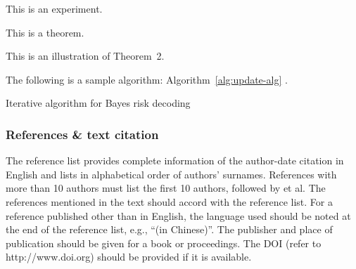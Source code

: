 \documentclass[twoside,twocolumn]{article}
\begin{document}
\begin{experiment}
This is an experiment.
\end{experiment}

\begin{theorem}
This is a theorem.
\end{theorem}

\begin{theorem}
This is an illustration of Theorem~2.
\end{theorem}

The following is a sample algorithm: Algorithm~\ref{alg:update-alg} \citep{Xu11}.

\begin{algorithm}\small
\centering
\caption{Iterative algorithm for Bayes risk decoding} \label{alg:update-alg}
\begin{algorithmic}[1]
	\LOOP	
		\ENDFOR
		\ENDIF
	\ENDLOOP
\end{algorithmic}
\end{algorithm}	

\subsubsection{References \& text citation}

The reference list provides complete information of the author-date citation in English and lists in alphabetical order of authors' surnames.
References with more than 10 authors must list the first 10 authors, followed by {et al}. The references mentioned in the text should accord with the reference list. For a reference published other than in English, the language used should be noted at the end of the reference list, e.g., ``(in Chinese)''. The publisher and place of publication should be given for a book or proceedings. The DOI (refer to http://www.doi.org) should be provided if it is available.
\end{document}
